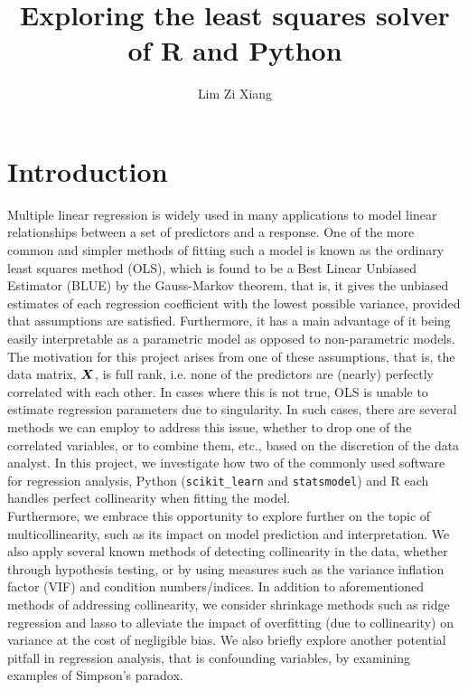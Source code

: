 \documentclass[12pt]{article}
\title{Exploring the least squares solver of R and Python}
\author{Lim Zi Xiang}
\date{}
\begin{document}
	\tableofcontents
	\pagebreak
	
	\section{Introduction}
	
	Multiple linear regression is widely used in many applications to model linear relationships between a set of predictors and a response. One of the more common and simpler methods of fitting such a model is known as the ordinary least squares method (OLS), which is found to be a Best Linear Unbiased Estimator (BLUE) by the Gauss-Markov theorem, that is, it gives the unbiased estimates of each regression coefficient with the lowest possible variance, provided that assumptions are satisfied. Furthermore, it has a main advantage of it being easily interpretable as a parametric model as opposed to non-parametric models.\\
	
	\setlength\parindent{24pt} The motivation for this project arises from one of these assumptions, that is, the data matrix, $\boldsymbol{X}$, is full rank, i.e. none of the predictors are (nearly) perfectly correlated with each other. In cases where this is not true, OLS is unable to estimate regression parameters due to singularity. In such cases, there are several methods we can employ to address this issue, whether to drop one of the correlated variables, or to combine them, etc., based on the discretion of the data analyst. In this project, we investigate how two of the commonly used software for regression analysis, Python (\texttt{scikit\_learn} and \texttt{statsmodel}) and R each handles perfect collinearity when fitting the model.\\
	
	Furthermore, we embrace this opportunity to explore further on the topic of multicollinearity, such as its impact on model prediction and interpretation. We also apply several known methods of detecting collinearity in the data, whether through hypothesis testing, or by using measures such as the variance inflation factor (VIF) and condition numbers/indices. In addition to aforementioned methods of addressing collinearity, we consider shrinkage methods such as ridge regression and lasso to alleviate the impact of overfitting (due to collinearity) on variance at the cost of negligible bias. We also briefly explore another potential pitfall in regression analysis, that is confounding variables, by examining examples of Simpson's paradox.\\
	
\end{document}
